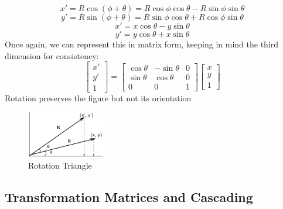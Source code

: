 \documentclass{article}
\begin{document}
\[x' = R \cos ( \phi + \theta ) = R \cos \phi \cos \theta - R \sin \phi \sin \theta\]
\[y' = R \sin ( \phi + \theta ) = R \sin \phi \cos \theta + R \cos \phi \sin \theta\]
\[x' = x \cos \theta - y \sin \theta\]
\[y' = y \cos \theta + x \sin \theta\]
\noindent
Once again, we can represent this in matrix form, keeping in mind the third dimension for consistency:
\[
\begin{bmatrix}
x' \\
y' \\
1
\end{bmatrix}
=
\begin{bmatrix}
\cos \theta & -\sin \theta & 0 \\
\sin \theta & \cos \theta & 0 \\
0 & 0 & 1
\end{bmatrix}
\begin{bmatrix}
x \\
y \\
1
\end{bmatrix}
\]
\noindent
Rotation preserves the figure but not its orientation

\begin{figure}[!htb]
    \begin{center}
        \includegraphics[width=0.30\textwidth]{rotation_triangle_flat.png}
        \vspace{-20pt}
    \end{center}
    \caption{Rotation Triangle}
\end{figure}

\subsection{Transformation Matrices and Cascading}
\end{document}
